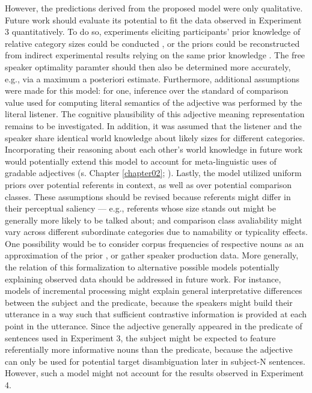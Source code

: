 However, the predictions derived from the proposed model were only qualitative. Future work should evaluate its potential to fit the data observed in Experiment 3 quantitatively. To do so, experiments eliciting participants' prior knowledge of relative category sizes could be conducted \parencite{franke2016does}, or the priors could be reconstructed from indirect experimental results relying on the same prior knowledge \parencite[following][]{tessler2017warm}. The free speaker optimality paramter should then also be determined more accurately, e.g., via a maximum a posteriori estimate. %
Furthermore, additional assumptions were made for this model: for one, inference over the standard of comparison value used for computing literal semantics of the adjective was performed by the literal listener. The cognitive plausibility of this adjective meaning representation remains to be investigated. In addition, it was assumed that the listener and the speaker share identical world knowledge about likely sizes for different categories. Incorporating their reasoning about each other's world knowledge in future work would potentially extend this model to account for meta-linguistic uses of gradable adjectives (s. Chapter \ref{chapter02}; \textcite{barker2002dynamics}). Lastly, the model utilized uniform priors over potential referents in context, as well as over potential comparison classes. These assumptions should be revised because referents might differ in their perceptual saliency --- e.g., referents whose size stands out might be generally more likely to be talked about; and comparison class avaliability might vary across different subordinate categories due to namability or typicality effects. One possibility would be to consider corpus frequencies of respective nouns as an approximation of the prior \parencite[following the model by][]{tessler2017warm}, or gather speaker production data. 
More generally, the relation of this formalization to alternative possible models potentially explaining observed data should be addressed in future work. For instance, models of incremental processing might explain general interpretative differences between the subject and the predicate, because the speakers might build their utterance in a way such that sufficient contrastive information is provided at each point in the utterance. Since the adjective generally appeared in the predicate of sentences used in Experiment 3, the subject might be expected to feature referentially more informative nouns than the predicate, because the adjective can only be used for potential target disambiguation later  in subject-N sentences. However, such a model might not account for the results observed in Experiment 4.  
